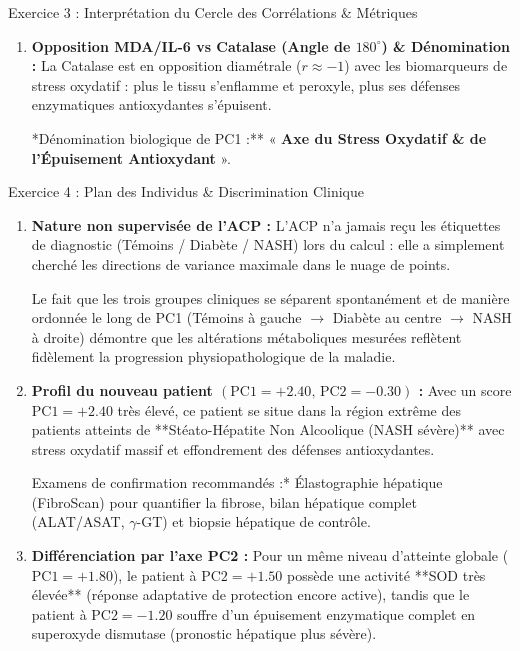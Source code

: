\documentclass[11pt,a4paper]{article}
\begin{document}
\begin{solutionbox}{Exercice 3 : Interprétation du Cercle des Corrélations \& Métriques}
\begin{enumerate}[label=\textbf{\alph*.}]
  \item \textbf{Opposition MDA/IL-6 vs Catalase (Angle de $180^\circ$) \& Dénomination :}
  La Catalase est en opposition diamétrale ($r \approx -1$) avec les biomarqueurs de stress oxydatif : plus le tissu s'enflamme et peroxyle, plus ses défenses enzymatiques antioxydantes s'épuisent.
  \par **Dénomination biologique de PC1 :** « \textbf{Axe du Stress Oxydatif \& de l'Épuisement Antioxydant} ».
\end{enumerate}
\end{solutionbox}

\begin{solutionbox}{Exercice 4 : Plan des Individus \& Discrimination Clinique}
\begin{enumerate}[label=\textbf{\alph*.}]
  \item \textbf{Nature non supervisée de l'ACP :}
  L'ACP n'a jamais reçu les étiquettes de diagnostic (Témoins / Diabète / NASH) lors du calcul : elle a simplement cherché les directions de variance maximale dans le nuage de points.
  \par Le fait que les trois groupes cliniques se séparent spontanément et de manière ordonnée le long de PC1 (Témoins à gauche $\to$ Diabète au centre $\to$ NASH à droite) démontre que les altérations métaboliques mesurées reflètent fidèlement la progression physiopathologique de la maladie.

  \item \textbf{Profil du nouveau patient $(\text{PC1} = +2.40, \, \text{PC2} = -0.30)$ :}
  Avec un score $\text{PC1} = +2.40$ très élevé, ce patient se situe dans la région extrême des patients atteints de **Stéato-Hépatite Non Alcoolique (NASH sévère)** avec stress oxydatif massif et effondrement des défenses antioxydantes.
  \par *Examens de confirmation recommandés :* Élastographie hépatique (FibroScan) pour quantifier la fibrose, bilan hépatique complet (ALAT/ASAT, $\gamma$-GT) et biopsie hépatique de contrôle.

  \item \textbf{Différenciation par l'axe PC2 :}
  Pour un même niveau d'atteinte globale ($\text{PC1} = +1.80$), le patient à $\text{PC2} = +1.50$ possède une activité **SOD très élevée** (réponse adaptative de protection encore active), tandis que le patient à $\text{PC2} = -1.20$ souffre d'un épuisement enzymatique complet en superoxyde dismutase (pronostic hépatique plus sévère).
\end{enumerate}
\end{solutionbox}
\end{document}
